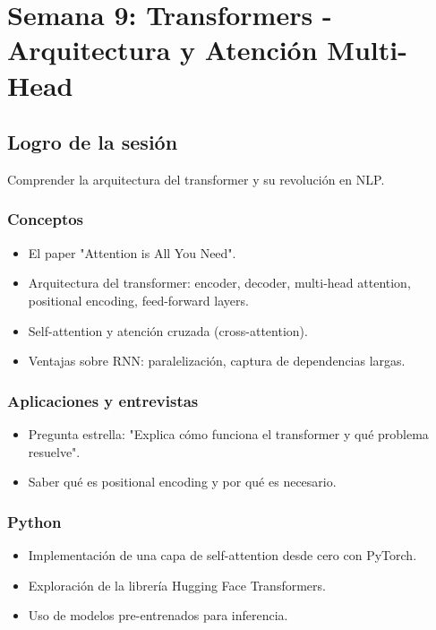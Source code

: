 \documentclass[12pt,a4paper,openany,oneside]{book}
\begin{document}
\chapter{Semana 9: Transformers - Arquitectura y Atención Multi-Head}

\section{Logro de la sesión}
Comprender la arquitectura del transformer y su revolución en NLP.

\subsection{Conceptos}
\begin{itemize}
    \item El paper "Attention is All You Need".
    \item Arquitectura del transformer: encoder, decoder, multi-head attention, positional encoding, feed-forward layers.
    \item Self-attention y atención cruzada (cross-attention).
    \item Ventajas sobre RNN: paralelización, captura de dependencias largas.
\end{itemize}

\subsection{Aplicaciones y entrevistas}
\begin{itemize}
    \item Pregunta estrella: "Explica cómo funciona el transformer y qué problema resuelve".
    \item Saber qué es positional encoding y por qué es necesario.
\end{itemize}

\subsection{Python}
\begin{itemize}
    \item Implementación de una capa de self-attention desde cero con PyTorch.
    \item Exploración de la librería Hugging Face Transformers.
    \item Uso de modelos pre-entrenados para inferencia.
\end{itemize}
\end{document}
